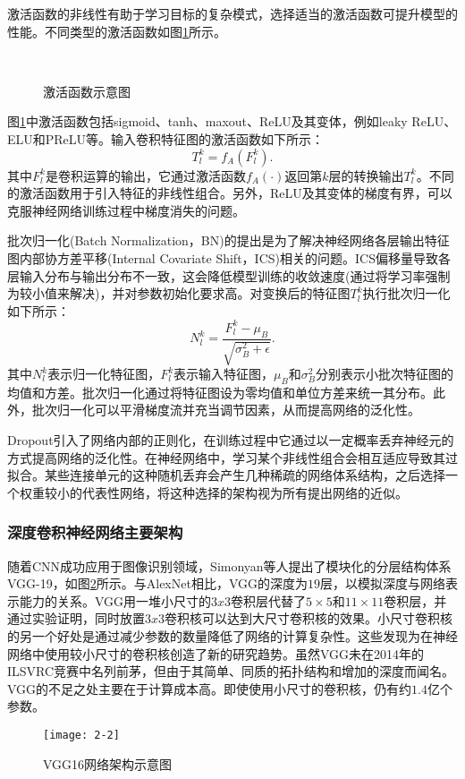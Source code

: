 激活函数的非线性有助于学习目标的复杂模式，选择适当的激活函数可提升模型的性能。不同类型的激活函数如图\ref{fig:2-1}所示。
\begin{figure}[!htbp]
	\centering
	\subfigure[Sigmod型激活函数]{
		\texttt{[image: 2-1-1]}
	}\hspace{0.1\linewidth}
	\subfigure[ReLU激活函数及其变体]{
		\texttt{[image: 2-1-2]}
	}
	\caption{激活函数示意图} \label{fig:2-1} 
\end{figure}

图\ref{fig:2-1}中激活函数包括sigmoid、tanh、maxout、ReLU及其变体，例如leaky ReLU、ELU和PReLU等。输入卷积特征图的激活函数如下所示：
\begin{equation} \label{activation}
	T_l^k=f_A(F_l^k).
\end{equation}
其中$F_l^k$是卷积运算的输出，它通过激活函数$f_A(\cdot)$返回第$k$层的转换输出$T_l^k$。不同的激活函数用于引入特征的非线性组合。另外，ReLU及其变体的梯度有界，可以克服神经网络训练过程中梯度消失的问题。

批次归一化(Batch Normalization，BN)的提出是为了解决神经网络各层输出特征图内部协方差平移(Internal Covariate Shift，ICS)相关的问题。ICS偏移量导致各层输入分布与输出分布不一致，这会降低模型训练的收敛速度(通过将学习率强制为较小值来解决)，并对参数初始化要求高。对变换后的特征图$T_l^k$执行批次归一化如下所示：
\begin{equation} \label{bn}
	N_l^k=\frac{F_l^k-\mu_B}{\sqrt{\sigma_B^2+\epsilon}}.
\end{equation}
其中$N_l^k$表示归一化特征图，$F_l^k$表示输入特征图，$\mu_B$和$\sigma_B^2$分别表示小批次特征图的均值和方差。批次归一化通过将特征图设为零均值和单位方差来统一其分布。此外，批次归一化可以平滑梯度流并充当调节因素，从而提高网络的泛化性。

Dropout引入了网络内部的正则化，在训练过程中它通过以一定概率丢弃神经元的方式提高网络的泛化性。在神经网络中，学习某个非线性组合会相互适应导致其过拟合。某些连接单元的这种随机丢弃会产生几种稀疏的网络体系结构，之后选择一个权重较小的代表性网络，将这种选择的架构视为所有提出网络的近似。

\subsubsection{深度卷积神经网络主要架构}
随着CNN成功应用于图像识别领域，Simonyan等人提出了模块化的分层结构体系VGG-19，如图\ref{fig:2-2}所示。与AlexNet相比，VGG的深度为$19$层，以模拟深度与网络表示能力的关系。VGG用一堆小尺寸的$3x3$卷积层代替了$5\times5$和$11\times11$卷积层，并通过实验证明，同时放置$3x3$卷积核可以达到大尺寸卷积核的效果。小尺寸卷积核的另一个好处是通过减少参数的数量降低了网络的计算复杂性。这些发现为在神经网络中使用较小尺寸的卷积核创造了新的研究趋势。虽然VGG未在2014年的ILSVRC竞赛中名列前茅，但由于其简单、同质的拓扑结构和增加的深度而闻名。VGG的不足之处主要在于计算成本高。即使使用小尺寸的卷积核，仍有约$1.4$亿个参数。
\begin{figure}[!hptb]
	\centering
	\texttt{[image: 2-2]}
	\caption{VGG16网络架构示意图}\label{fig:2-2}
\end{figure}

